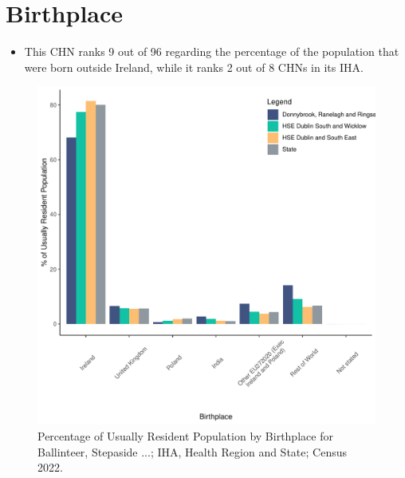 \documentclass{article}
\begin{document}
\section{Birthplace}\label{sect:Birth}
\begin{itemize}
\item This CHN ranks  9 out of 96 regarding the percentage of the population that were born outside Ireland, while it ranks  2 out of 8 CHNs in its IHA.
\end{itemize}
\begin{figure}[H]
	\centering
	\includegraphics[width = 130mm]{../figures/BirthED.pdf}
	\caption{Percentage of Usually Resident Population by Birthplace for Ballinteer, Stepaside ...; IHA, Health Region and State; Census 2022.}
	\label{fig:vbnv}
	\end{figure}
	
\end{document}
